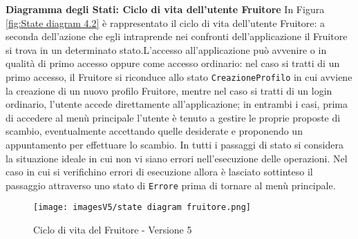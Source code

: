 \textbf{Diagramma degli Stati: Ciclo di vita dell'utente Fruitore}\newline
In Figura \ref{fig:State diagram 4.2} è rappresentato il ciclo di vita dell'utente Fruitore: a seconda dell'azione che egli intraprende nei confronti dell'applicazione il Fruitore si trova in un determinato stato.\newline L'accesso all'applicazione può avvenire o in qualità di primo accesso oppure come accesso ordinario: nel caso si tratti di un primo accesso, il Fruitore si riconduce allo stato \texttt{CreazioneProfilo} in cui avviene la creazione di un nuovo profilo Fruitore, mentre nel caso si tratti di un login ordinario, l'utente accede direttamente all'applicazione; in entrambi i casi, prima di accedere al menù principale l'utente è tenuto a gestire le proprie proposte di scambio, eventualmente accettando quelle desiderate e proponendo un appuntamento per effettuare lo scambio.\newline 
In tutti i passaggi di stato si considera la situazione ideale in cui non vi siano errori nell'esecuzione delle operazioni. Nel caso in cui si verifichino errori di esecuzione allora è lasciato sottinteso il passaggio attraverso uno stato di \texttt{Errore} prima di tornare al menù principale.

\begin{figure}[!]
\centering
\texttt{[image: imagesV5/state diagram fruitore.png]}
\caption{\label{fig:State diagram 5.2}Ciclo di vita del Fruitore - Versione 5}
\end{figure}\bigskip